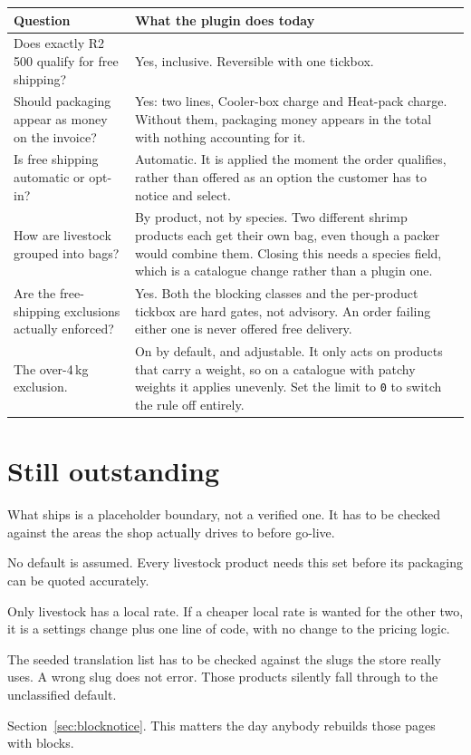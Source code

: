 \documentclass[11pt,a4paper,oneside]{report}
\newcommand{\opt}[1]{\texttt{\small #1}}
\newcommand{\R}[1]{R#1}
\begin{document}
\begin{longtable}{@{}L{5.0cm}L{9.8cm}@{}}
\toprule
\textbf{Question} & \textbf{What the plugin does today}\\
\midrule
\endhead
Does exactly \R{2\,500} qualify for free shipping? &
Yes, inclusive. Reversible with one tickbox.\\
\addlinespace
Should packaging appear as money on the invoice? &
Yes: two lines, \textsf{Cooler-box charge} and \textsf{Heat-pack charge}. Without
them, packaging money appears in the total with nothing accounting for it.\\
\addlinespace
Is free shipping automatic or opt-in? &
Automatic. It is applied the moment the order qualifies, rather than offered as an
option the customer has to notice and select.\\
\addlinespace
How are livestock grouped into bags? &
By product, not by species. Two different shrimp products each get their own bag, even
though a packer would combine them. Closing this needs a species field, which is a
catalogue change rather than a plugin one.\\
\addlinespace
Are the free-shipping exclusions actually enforced? &
Yes. Both the blocking classes and the per-product tickbox are hard gates, not
advisory. An order failing either one is never offered free delivery.\\
\addlinespace
The over-4\,kg exclusion. &
On by default, and adjustable. It only acts on products that carry a weight, so on a
catalogue with patchy weights it applies unevenly. Set the limit to \opt{0} to switch
the rule off entirely.\\
\bottomrule
\end{longtable}

\section{Still outstanding}

\begin{description}[style=unboxed,leftmargin=0pt,font=\sffamily\bfseries]
  \item[The local-delivery postcode list.] What ships is a placeholder boundary, not a
    verified one. It has to be checked against the areas the shop actually drives to
    before go-live.
  \item[Units per bag, per species.] No default is assumed. Every livestock product
    needs this set before its packaging can be quoted accurately.
  \item[A local tier for dry goods and very-large items.] Only livestock has a
    local rate. If a cheaper local rate is wanted for the other two, it is a settings
    change plus one line of code, with no change to the pricing logic.
  \item[The shipping-class slugs.] The seeded translation list has to be checked
    against the slugs the store really uses. A wrong slug does not error. Those
    products silently fall through to the unclassified default.
  \item[Notices on the block cart and checkout.] Section~\ref{sec:blocknotice}. This
    matters the day anybody rebuilds those pages with blocks.
\end{description}
\end{document}
